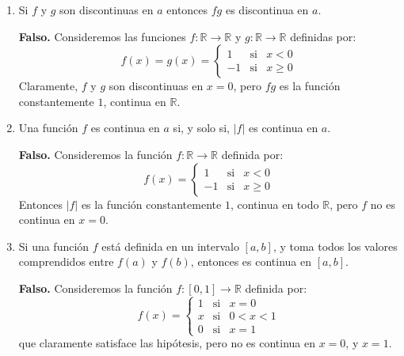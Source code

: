 \documentclass[10pt,a4paper]{article}
\begin{document}
\begin{enumerate}
		\item Si $f$ y $g$ son discontinuas en $a$ entonces $fg$ es discontinua en $a$.
		
		\textbf{Falso. }Consideremos las funciones $f: \mathbb{R} \rightarrow \mathbb{R}$ y $g : \mathbb{R} \rightarrow \mathbb{R}$ definidas por:
		\begin{equation*}
			f(x) = g(x) = \left\{ \begin{array}{lcc}
				1 &   \text{si}  & x < 0 \\
				-1 &  \text{si} & x \geq 0
			\end{array}
			\right.
		\end{equation*}
		Claramente, $f$ y $g$ son discontinuas en $x = 0$, pero $fg$ es la función constantemente $1$, continua en $\mathbb{R}$. \newline
				
		\item Una función $f$ es continua en $a$ si, y solo si, $|f|$ es continua en $a$.
		
		\textbf{Falso. }Consideremos la función $f: \mathbb{R} \rightarrow \mathbb{R}$ definida por:
		\begin{equation*}
			f(x) = \left\{ \begin{array}{lcc}
				1 &   \text{si}  & x < 0 \\
				-1 &  \text{si} & x \geq 0
			\end{array}
			\right.
		\end{equation*}
		Entonces $|f|$ es la función constantemente $1$, continua en todo $\mathbb{R}$, pero $f$ no es continua en $x = 0$. \newline
		
		\item Si una función $f$ está definida en un intervalo $[a, b]$, y toma todos los valores comprendidos entre $f(a)$ y $f(b)$, entonces es continua en $[a, b]$.
		
		\textbf{Falso. }Consideremos la función $f : [0, 1] \rightarrow \mathbb{R}$ definida por:
		\begin{equation*}
			f(x) = \left\{ \begin{array}{lcc}
				1 &   \text{si}  & x = 0 \\
				x &  \text{si} & 0 < x < 1 \\
				0 & \text{si} & x = 1
			\end{array}
			\right.
		\end{equation*}
		que claramente satisface las hipótesis, pero no es continua en $x = 0$, y $x = 1$. \newline
		

\end{enumerate}
\end{document}
